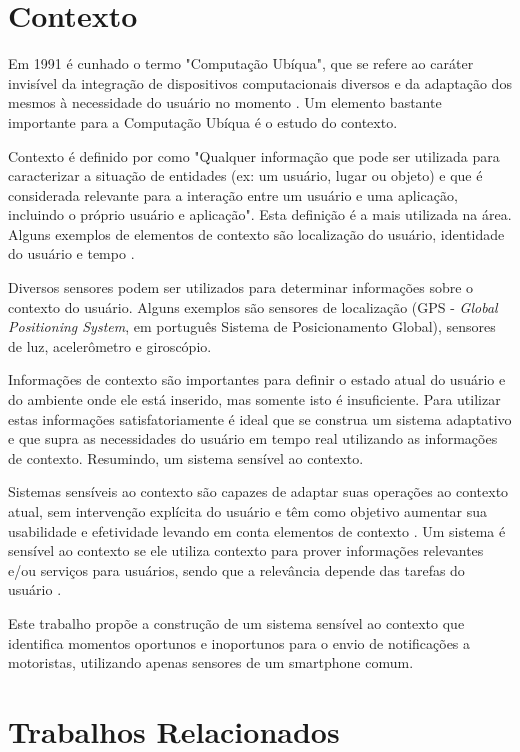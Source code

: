 \section{Contexto}
\label{contexto}

Em 1991 é cunhado o termo "Computação Ubíqua", que se refere ao caráter invisível da integração de dispositivos
computacionais diversos e da adaptação dos mesmos à necessidade do usuário no momento \cite{weiser1991computer}.
Um elemento bastante importante para a Computação Ubíqua é o estudo do contexto.

Contexto é definido por  como "Qualquer informação que pode ser utilizada para
caracterizar a situação de entidades (ex: um usuário, lugar ou objeto) e que é considerada relevante para
a interação entre um usuário e uma aplicação, incluindo o próprio usuário e aplicação". Esta definição é
a mais utilizada na área. Alguns exemplos de elementos de contexto são
localização do usuário, identidade do usuário e tempo \cite{ryan1999enhanced}.

Diversos sensores podem ser utilizados para determinar informações sobre o contexto do usuário. Alguns exemplos são
sensores de localização (GPS - \textit{Global Positioning System}, em português Sistema de Posicionamento Global),
sensores de luz, acelerômetro e giroscópio.

Informações de contexto são importantes para definir o estado atual do usuário e do ambiente onde ele está inserido,
mas somente isto é insuficiente. Para utilizar estas informações satisfatoriamente é ideal que se construa um sistema
adaptativo e que supra as necessidades do usuário em tempo real utilizando as informações de contexto. Resumindo,
um sistema sensível ao contexto.

Sistemas sensíveis ao contexto são capazes de adaptar suas operações ao contexto atual, sem intervenção
explícita do usuário e têm como objetivo aumentar sua usabilidade e efetividade levando em conta elementos
de contexto \cite{baldauf2007survey}.  Um sistema é sensível ao contexto se ele utiliza contexto para prover
informações relevantes e/ou serviços para usuários, sendo que a relevância depende das tarefas do usuário
\cite{abowd1999towards}.

Este trabalho propõe a construção de um sistema sensível ao contexto que identifica momentos oportunos e inoportunos para
o envio de notificações a motoristas, utilizando apenas sensores de um smartphone comum.

\section{Trabalhos Relacionados}
\label{trabalhos-relacionados}

